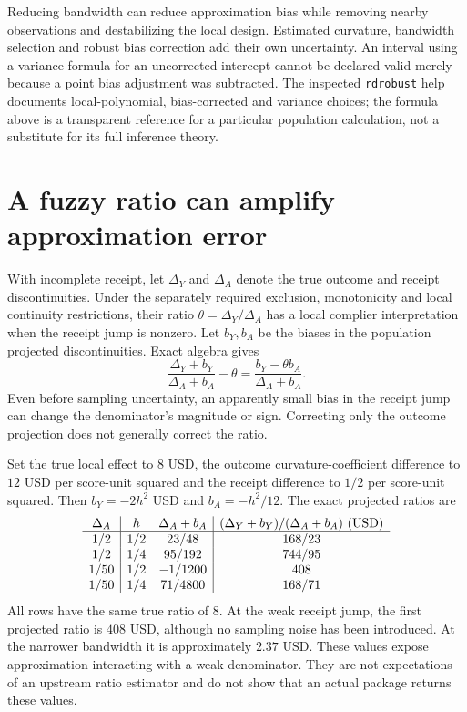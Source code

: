 Reducing bandwidth can reduce approximation bias while removing nearby
observations and destabilizing the local design. Estimated curvature,
bandwidth selection and robust bias correction add their own uncertainty.
An interval using a variance formula for an uncorrected intercept cannot be
declared valid merely because a point bias adjustment was subtracted. The
inspected \texttt{rdrobust} help documents local-polynomial, bias-corrected
and variance choices; the formula above is a transparent reference for a
particular population calculation, not a substitute for its full inference
theory.~\citep{exec13_ivrd_rdrobust}

\section{A fuzzy ratio can amplify approximation error}
\label{exec17:s4-fuzzy}

With incomplete receipt, let $\Delta_Y$ and $\Delta_A$ denote the true
outcome and receipt discontinuities. Under the separately required exclusion,
monotonicity and local continuity restrictions, their ratio
$\theta=\Delta_Y/\Delta_A$ has a local complier interpretation when the
receipt jump is nonzero. Let $b_Y,b_A$ be the biases in the population
projected discontinuities. Exact algebra gives
\begin{equation}
 \frac{\Delta_Y+b_Y}{\Delta_A+b_A}-\theta
       =\frac{b_Y-\theta b_A}{\Delta_A+b_A}.
 \label{exec17:s4-fuzzy-bias}
\end{equation}
Even before sampling uncertainty, an apparently small bias in the receipt
jump can change the denominator's magnitude or sign. Correcting only the
outcome projection does not generally correct the ratio.

Set the true local effect to $8$ USD, the outcome curvature-coefficient
difference to $12$ USD per score-unit squared and the receipt difference to
$1/2$ per score-unit squared. Then $b_Y=-2h^2$ USD and $b_A=-h^2/12$.
The exact projected ratios are
\[
\begin{array}{c|cc|c}
 \Delta_A&h&\Delta_A+b_A&
    (\Delta_Y+b_Y)/(\Delta_A+b_A)\ ({\rm USD})\\ \hline
 1/2&1/2&23/48&168/23\\
 1/2&1/4&95/192&744/95\\
 1/50&1/2&-1/1200&408\\
 1/50&1/4&71/4800&168/71
\end{array}
\]
All rows have the same true ratio of $8$. At the weak receipt jump, the
first projected ratio is $408$ USD, although no sampling noise has been
introduced. At the narrower bandwidth it is approximately $2.37$ USD.
These values expose approximation interacting with a weak denominator.
They are not expectations of an upstream ratio estimator and do not show
that an actual package returns these values.~\citep{exec17_s4_math}

